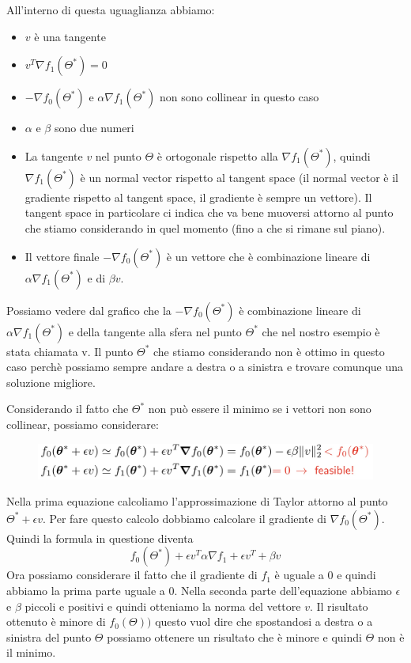 \documentclass[14pt]{extreport}
\begin{document}
All'interno di questa uguaglianza abbiamo:
\begin{itemize}
\item $v$ è una tangente
\item $v^T\nabla f_1(\Theta^*) = 0$
\item $-\nabla f_0(\Theta^*)$ e $\alpha \nabla f_1(\Theta^*)$ non sono collinear in questo caso
\item $\alpha$ e $\beta$ sono due numeri
\item La tangente $v$ nel punto $\Theta$ è ortogonale rispetto alla $\nabla f_1(\Theta^*)$, quindi $\nabla f_1(\Theta^*)$ è un normal vector rispetto
al tangent space (il normal vector è il gradiente rispetto al tangent space, il gradiente è sempre un vettore). Il tangent space in particolare ci
indica che va bene muoversi attorno al punto che stiamo considerando in quel momento (fino a che si rimane sul piano).
\item Il vettore finale $-\nabla f_0(\Theta^*)$ è un vettore che è combinazione lineare di $\alpha \nabla f_1(\Theta^*)$ e di $\beta v$.
\end{itemize}

Possiamo vedere dal grafico che la $-\nabla f_0(\Theta^*)$ è combinazione lineare di $\alpha \nabla f_1(\Theta^*)$ e della tangente alla sfera nel
punto $\Theta^*$ che nel nostro esempio è stata chiamata v. Il punto $\Theta^*$ che stiamo considerando non è ottimo in questo caso perchè possiamo
sempre andare a destra o a sinistra e trovare comunque una soluzione migliore.

Considerando il fatto che $\Theta^*$ non può essere il minimo se i vettori non sono collinear, possiamo considerare:

\begin{figure}[H]
\centering
\includegraphics[width=0.7\linewidth]{291.jpeg}
\end{figure}

Nella prima equazione calcoliamo l'approssimazione di Taylor attorno al punto $\Theta^*+\epsilon v$. Per fare questo calcolo dobbiamo calcolare il
gradiente di $\nabla f_0(\Theta^*)$. Quindi la formula in questione diventa $$f_0(\Theta^*) + \epsilon v^T\alpha\nabla f_1 + \epsilon v^T + \beta v$$
Ora possiamo considerare il fatto che il gradiente di $f_1$ è uguale a 0 e quindi abbiamo la prima parte uguale a 0. Nella seconda parte
dell'equazione abbiamo $\epsilon$ e $\beta$ piccoli e positivi e quindi otteniamo la norma del vettore $v$. Il risultato ottenuto è minore di
$f_0(\Theta))$ questo vuol dire che spostandosi a destra o a sinistra del punto $\Theta$ possiamo ottenere un risultato che è minore e quindi $\Theta$
non è il minimo.
\end{document}
